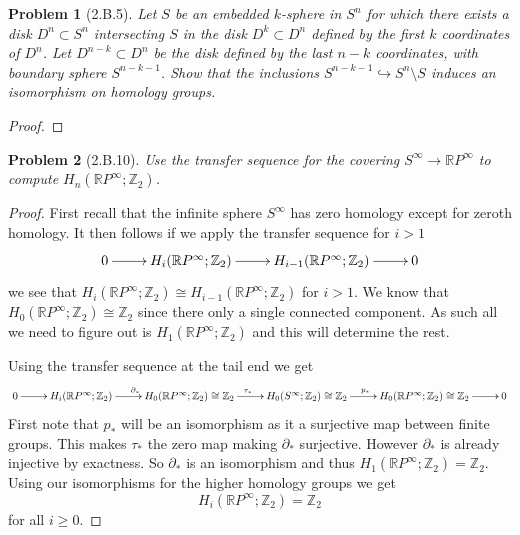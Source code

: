 \documentclass[10pt]{article}
\newcommand{\sk}{\vskip 10mm}
\newcommand{\bb}[1]{\mathbb{#1}}
\theoremstyle{plain}
\newtheorem{problem}{Problem}
\theoremstyle{remark}
\begin{document}
\begin{problem}[2.B.5]
  Let $S$ be an embedded $k$-sphere in $S^n$ for which there exists a disk
  $D^n\subset S^n$ intersecting $S$ in the disk $D^k\subset D^n$ defined by the
  first $k$ coordinates of $D^n$. Let $D^{n-k}\subset D^n$ be the disk defined
  by the last $n-k$ coordinates, with boundary sphere $S^{n-k-1}$. Show that the
  inclusions $S^{n-k-1}\hookrightarrow S^n\setminus S$ induces an isomorphism on
  homology groups.
\end{problem}

\begin{proof}
  
\end{proof}

\sk

\begin{problem}[2.B.10]
  Use the transfer sequence for the covering $S^\infty\rightarrow\bb{R}P^\infty$
  to compute  $H_n(\bb{R}P^\infty;\bb{Z}_2)$.
\end{problem}

\begin{proof}
  First recall that the infinite sphere $S^\infty$ has zero homology except
  for zeroth homology. It then follows if we apply the transfer sequence
  for $i>1$
  \[
    \xymatrix{
      0 \ar[r] & H_i(\bb{R}P^\infty;\bb{Z}_2) \ar[r] & H_{i-1}(\bb{R}P^\infty;\bb{Z}_2) \ar[r] & 0
    }
  \]
  we see that $H_i(\bb{R}P^\infty;\bb{Z}_2)\cong H_{i-1}(\bb{R}P^\infty;\bb{Z}_2)$ for $i>1$.
  We know that $H_0(\bb{R}P^\infty;\bb{Z}_2)\cong \bb{Z}_2$ since there only a single
  connected component. As such all we need to figure out is $H_1(\bb{R}P^\infty;\bb{Z}_2)$
  and this will determine the rest.

  Using the transfer sequence at the tail end we get
  \[
    \xymatrix{
      0 \ar[r] & H_i(\bb{R}P^\infty;\bb{Z}_2) \ar[r]^{\partial_*} & H_0(\bb{R}P^\infty;\bb{Z}_2)\cong\bb{Z}_2 \ar[r]^{\tau_*} & H_0(S^\infty;\bb{Z}_2)\cong\bb{Z}_2 \ar[r]^{p_*} & H_0(\bb{R}P^\infty;\bb{Z}_2)\cong\bb{Z}_2 \ar[r] & 0
    }
  \]
  First note that $p_*$ will be an isomorphism as it a surjective map between
  finite groups. This makes $\tau_*$ the zero map making $\partial_*$ surjective.
  However $\partial_*$ is already injective by exactness. So $\partial_*$ is an isomorphism
  and thus $H_1(\bb{R}P^\infty;\bb{Z}_2)=\bb{Z}_2$. Using our isomorphisms for the
  higher homology groups we get
  \[
    H_i(\bb{R}P^\infty;\bb{Z}_2) = \bb{Z}_2
  \]
  for all $i\geq 0$.
\end{proof}

\end{document}
